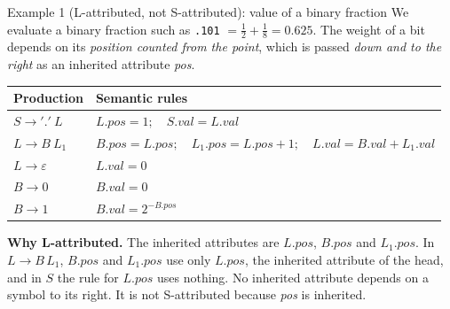\documentclass[11pt,a4paper]{article}
\newcommand{\at}[2]{\ensuremath{#1.\mathit{#2}}}
\newcommand{\tok}[1]{\ensuremath{\mathtt{#1}}}
\begin{document}
\begin{examplebox}{Example 1 (L-attributed, not S-attributed): value of a binary fraction}
We evaluate a binary fraction such as \texttt{.101} $=\tfrac12+\tfrac18=0.625$. The weight of a bit depends on its \emph{position counted from the point}, which is passed \emph{down and to the right} as an inherited attribute \textit{pos}.
\begin{center}
\small
\begin{tabular}{@{}l l@{}}
\toprule
\textbf{Production} & \textbf{Semantic rules} \\ \midrule
$S \to \tok{'.'}\ L$ & $\at{L}{pos}=1;\quad \at{S}{val}=\at{L}{val}$ \\
$L \to B\ L_1$ & $\at{B}{pos}=\at{L}{pos};\quad \at{L_1}{pos}=\at{L}{pos}+1;\quad \at{L}{val}=\at{B}{val}+\at{L_1}{val}$ \\
$L \to \varepsilon$ & $\at{L}{val}=0$ \\
$B \to 0$ & $\at{B}{val}=0$ \\
$B \to 1$ & $\at{B}{val}=2^{-\at{B}{pos}}$ \\ \bottomrule
\end{tabular}
\end{center}
\textbf{Why L-attributed.} The inherited attributes are $\at{L}{pos}$, $\at{B}{pos}$ and $\at{L_1}{pos}$. In $L\to B\,L_1$, $\at{B}{pos}$ and $\at{L_1}{pos}$ use only $\at{L}{pos}$, the inherited attribute of the head, and in $S$ the rule for $\at{L}{pos}$ uses nothing. No inherited attribute depends on a symbol to its right. It is not S-attributed because \textit{pos} is inherited.


\end{examplebox}
\end{document}
